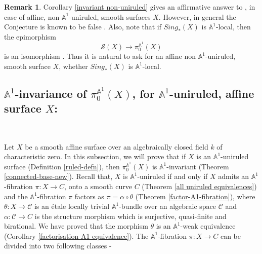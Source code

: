 \documentclass[11pt, reqno]{amsart}
\theoremstyle{plain}
\theoremstyle{definition}
\newtheorem{remark}[thm]{Remark}
\newcommand{\sC}{{\mathcal C}}
\newcommand{\A}{{\mathbb A}}
\begin{document}
\begin{remark}
Corollary \ref{invariant non-uniruled} gives an affirmative answer to \cite[Conjecture 2.2.8]{am}, in case of affine, non $\A^1$-uniruled, smooth surfaces $X$. However, in general the Conjecture is known to be false \cite[Section 4]{bhs}. Also, note that if $Sing_*(X)$ is $\mathbb{A}^1$-local, then the epimorphism 
$$\mathcal{S}(X) \to \pi_0^{\mathbb{A}^1}(X)$$
is an isomorphism \cite[Remark 2.2.9]{am}. Thus it is natural to ask for an affine non $\A^1$-uniruled, smooth surface $X$, whether $Sing_*(X)$ is $\mathbb{A}^1$-local.
\end{remark}
	
\subsection{$\A^1$-invariance of $\pi_0^{\A^1}(X)$, for $\A^1$-uniruled, affine surface $X$:}
\


Let $X$ be a smooth affine surface over an algebraically closed field $k$ of characteristic zero. In this subsection, we will prove that if $X$ is an $\A^1$-uniruled surface (Definition \ref{ruled-defn}), then $\pi_0^{\A^1}(X)$ is $\A^1$-invariant (Theorem \ref{connected-base-new}). Recall that, $X$ is $\A^1$-uniruled if and only if $X$ admits an $\A^1$-fibration $\pi:X \to C$, onto a smooth curve $C$ (Theorem \ref{all uniruled equivalences}) and the $\A^1$-fibration $\pi$ factors as $\pi= \alpha \circ \theta$ (Theorem \ref{factor-A1-fibration}), where $\theta: X \to \sC$ is an \'etale locally trivial $\A^1$-bundle over an algebraic space $\sC$ and $\alpha: \sC \to C$ is the structure morphism which is surjective, quasi-finite and birational. We have proved that the morphism $\theta$ is an $\A^1$-weak equivalence (Corollary \ref{factorisation A1 equivalence}). The $\A^1$-fibration $\pi: X \to C$ can be divided into two following classes -
\end{document}
